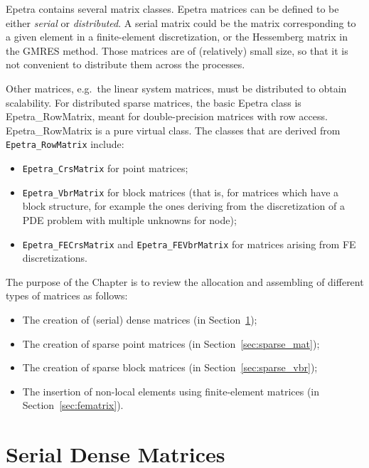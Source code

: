 \begin{introchapter}
Epetra contains several matrix classes.  Epetra matrices can be defined
to be either {\em serial} or {\em distributed}. A serial matrix could be
the matrix corresponding to a given element in a finite-element
discretization, or the Hessemberg matrix in the GMRES method. Those
matrices are of (relatively) small size, so that it is not convenient to
distribute them across the processes.

Other matrices, e.g.~the linear system matrices, must be distributed to
obtain scalability.  For distributed sparse matrices, the basic Epetra
class is Epetra\_RowMatrix, meant for double-precision matrices with row
access.  Epetra\_RowMatrix is a pure virtual class.  The classes that
are derived from \verb!Epetra_RowMatrix! include:
\begin{itemize}
\item \verb!Epetra_CrsMatrix! for point matrices;
\item \verb!Epetra_VbrMatrix! for block matrices (that is, for
  matrices which have a block structure, for example the ones deriving
  from the discretization of a PDE problem with multiple unknowns for
  node);
\item \verb!Epetra_FECrsMatrix! and \verb!Epetra_FEVbrMatrix! for
  matrices arising from FE discretizations.
\end{itemize}

The purpose of the Chapter is to review the allocation and assembling of
different types of matrices as follows:
\begin{itemize}
\item The creation of (serial) dense matrices (in Section~\ref{sec:dense_mat});
\item The creation of sparse point matrices (in Section~\ref{sec:sparse_mat});
\item The creation of sparse block matrices (in Section~\ref{sec:sparse_vbr});
\item The insertion of non-local elements using finite-element matrices
  (in Section~\ref{sec:fematrix}).
\end{itemize}
\end{introchapter}


\section{Serial Dense Matrices}
\label{sec:dense_mat}

